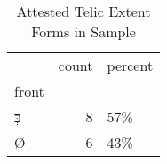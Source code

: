 \begin{table}[htbp!]
\centering
\caption{Attested Telic Extent Forms in Sample}
\label{table:telic_front}
\begin{tabular}{lrl}
\toprule
{} &  count & percent \\
front            &        &         \\
\midrule
\texthebrew{בְּ} &      8 &     57\% \\
\texthebrew{Ø}   &      6 &     43\% \\
\bottomrule
\end{tabular}
\end{table}
